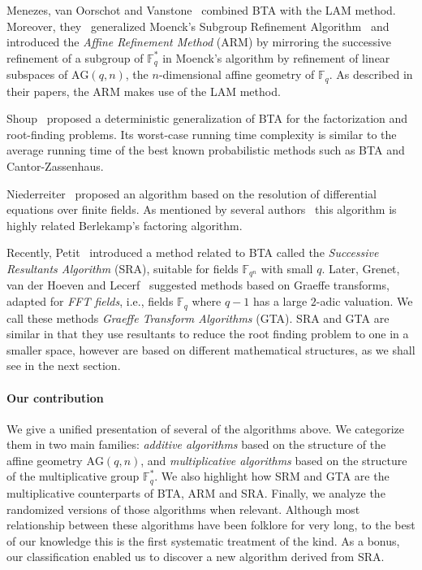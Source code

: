 \documentclass{article}
\newcommand{\ff}[1]{\mathbb{F}_{#1}}
\newcommand{\qq}{q}
\newcommand{\nn}{n}
\newcommand{\AG}{\mathrm{AG}(\qq,\nn)}
\newcounter{algo}
\begin{document}
Menezes, van Oorschot and Vanstone~\cite{MenezesOV88,OorschotV89}
combined BTA with the LAM method. Moreover, they~\cite{Menvanovans92}
generalized Moenck's Subgroup Refinement Algorithm~\cite{Moenck77} and
introduced the \emph{Affine Refinement Method} (ARM) by mirroring the
successive refinement of a subgroup of $\ff{q}^\ast$ in Moenck's
algorithm by refinement of linear subspaces of $\AG$, the
$n$-dimensional affine geometry of $\ff{q}$.  As described in their
papers, the ARM makes use of the LAM method.

Shoup~\cite{Shoup91b} proposed a deterministic generalization of BTA
for the factorization and root-finding problems. Its worst-case
running time complexity is similar to the average running time of the
best known probabilistic methods such as BTA and Cantor-Zassenhaus.

Niederreiter~\cite{nied94} proposed an algorithm based on the
resolution of differential equations over finite fields.  As mentioned
by several authors~\cite{Fleis96} this algorithm is highly related
Berlekamp's factoring algorithm.

Recently, Petit~\cite{cgUCL-P14} introduced a method related to BTA
called the \emph{Successive Resultants Algorithm} (SRA), suitable for
fields $\ff{q^n}$ with small $q$. Later, Grenet, van der Hoeven and
Lecerf~\cite{grenet-hoeven-lecerf-roots,grenet2015deterministic}
suggested methods based on Graeffe transforms, adapted for \emph{FFT
  fields}, i.e., fields $\ff{q}$ where $q-1$ has a large $2$-adic
valuation. We call these methods \emph{Graeffe Transform Algorithms}
(GTA). SRA and GTA are similar in that they use resultants to reduce
the root finding problem to one in a smaller space, however are based
on different mathematical structures, as we shall see in the next
section.


\paragraph{Our contribution}
We give a unified presentation of several of the algorithms above. We
categorize them in two main families: \emph{additive algorithms} based
on the structure of the affine geometry $\AG$, and
\emph{multiplicative algorithms} based on the structure of the
multiplicative group $\ff{q}^\ast$.  We also highlight how SRM and GTA
are the multiplicative counterparts of BTA, ARM and SRA.  Finally, we
analyze the randomized versions of those algorithms when relevant.
Although most relationship between these algorithms have been folklore
for very long, to the best of our knowledge this is the first
systematic treatment of the kind. As a bonus, our classification
enabled us to discover a new algorithm derived from SRA.
\end{document}
